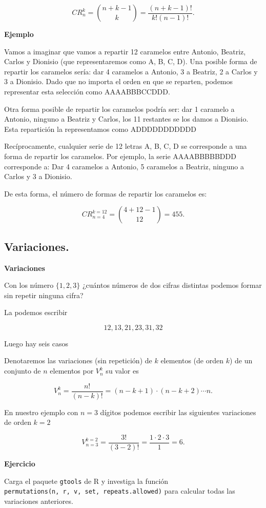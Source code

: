 \documentclass[
  letterpaper,
  DIV=11,
  numbers=noendperiod]{scrreprt}
\begin{document}
\[CR_n^k = \binom{n+k-1}{k} = \frac{(n+k-1)!}{k!(n-1)!}.\]

\textbf{Ejemplo}

Vamos a imaginar que vamos a repartir 12 caramelos entre Antonio,
Beatriz, Carlos y Dionisio (que representaremos como A, B, C, D). Una
posible forma de repartir los caramelos sería: dar 4 caramelos a
Antonio, 3 a Beatriz, 2 a Carlos y 3 a Dionisio. Dado que no importa el
orden en que se reparten, podemos representar esta selección como
AAAABBBCCDDD.

Otra forma posible de repartir los caramelos podría ser: dar 1 caramelo
a Antonio, ninguno a Beatriz y Carlos, los 11 restantes se los damos a
Dionisio. Esta repartición la representamos como ADDDDDDDDDDD

Recíprocamente, cualquier serie de 12 letras A, B, C, D se corresponde a
una forma de repartir los caramelos. Por ejemplo, la serie AAAABBBBBDDD
corresponde a: Dar 4 caramelos a Antonio, 5 caramelos a Beatriz, ninguno
a Carlos y 3 a Dionisio.

De esta forma, el número de formas de repartir los caramelos es:

\[CR_{n=4}^{k=12} = \binom{4+12-1}{12}=455.\]

\subsection{Variaciones.}\label{variaciones.}

\textbf{Variaciones}

Con los número \(\{1,2,3\}\) ¿cuántos números de dos cifras distintas
podemos formar sin repetir ninguna cifra?

La podemos escribir

\[12,13,21,23,31,32\]

Luego hay seis casos

Denotaremos las variaciones (sin repetición) de \(k\) elementos (de
orden \(k\)) de un conjunto de \(n\) elementos por \(V_n^k\) su valor es

\[
V_n^k=\frac{n!}{(n-k)!}=(n-k+1)\cdot (n-k+2)\cdots n.
\]

En nuestro ejemplo con \(n=3\) dígitos podemos escribir las siguientes
variaciones de orden \(k=2\)

\[
V^{k=2}_{n=3}=\frac{3!}{(3-2)!}=\frac{1\cdot 2\cdot 3}{1}=6.
\]

\textbf{Ejercicio}

Carga el paquete \texttt{gtools} de R y investiga la función
\texttt{permutations(n,\ r,\ v,\ set,\ repeats.allowed)} para calcular
todas las variaciones anteriores.
\end{document}
